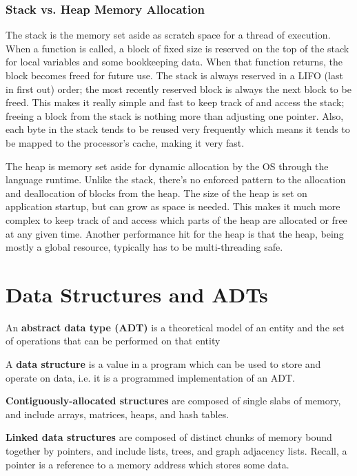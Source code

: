 \documentclass{article}
\begin{document}
    \subsubsection{Stack vs. Heap Memory Allocation}
    The stack is the memory set aside as scratch space for a thread of execution. When a function is called, a block of fixed size is reserved on the top of the stack for local variables and some bookkeeping data. When that function returns, the block becomes freed for future use. The stack is always reserved in a LIFO (last in first out) order; the most recently reserved block is always the next block to be freed. This makes it really simple and fast to keep track of and access the stack; freeing a block from the stack is nothing more than adjusting one pointer. Also, each byte in the stack tends to be reused very frequently which means it tends to be mapped to the processor's cache, making it very fast.

    The heap is memory set aside for dynamic allocation by the OS through the language runtime. Unlike the stack, there's no enforced pattern to the allocation and deallocation of blocks from the heap. The size of the heap is set on application startup, but can grow as space is needed. This makes it much more complex to keep track of and access which parts of the heap are allocated or free at any given time. Another performance hit for the heap is that the heap, being mostly a global resource, typically has to be multi-threading safe.

\newpage
\section{Data Structures and ADTs}
    An \textbf{abstract data type (ADT)} is a theoretical model of an entity and the set of operations that can be performed on that entity
    
    A \textbf{data structure} is a value in a program which can be used to store and operate on data, i.e. it is a programmed implementation of an ADT.
    
    \textbf{Contiguously-allocated structures} are composed of single slabs of memory, and include arrays, matrices, heaps, and hash tables.
     
    \textbf{Linked data structures} are composed of distinct chunks of memory bound together by pointers, and include lists, trees, and graph adjacency lists. Recall, a pointer is a reference to a memory address which stores some data.
\end{document}
